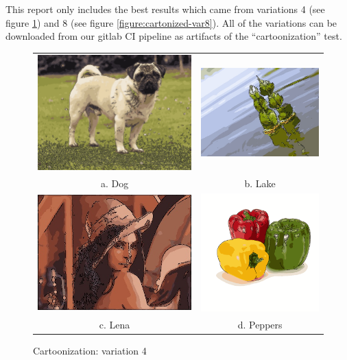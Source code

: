 \documentclass[]{IEEEtran}
\begin{document}
    This report only includes the best results which came from variations 4 (see figure \ref{figure:cartoonized-var4})
    and 8 (see figure \ref{figure:cartonized-var8}).
    All of the variations can be downloaded from our gitlab CI pipeline as artifacts of the ``cartoonization'' test.

    \begin{figure}[h]
      \centering
      \begin{tabular}{c c}
      \includegraphics[width=0.35\linewidth]{./figures/cartoonize/dog-3-2-2-var4.jpg} &
      \includegraphics[width=0.35\linewidth]{./figures/cartoonize/lake-3-2-2-var4.jpg} \\
      a. Dog & b. Lake \\
      \includegraphics[width=0.35\linewidth]{./figures/cartoonize/lena-3-2-2-var4.jpg} &
      \includegraphics[width=0.35\linewidth]{./figures/cartoonize/peppers-3-2-2-var4.png} \\
      c. Lena & d. Peppers \\
      \end{tabular}
      \caption{Cartoonization: variation 4}
      \label{figure:cartoonized-var4}
    \end{figure}
\end{document}
